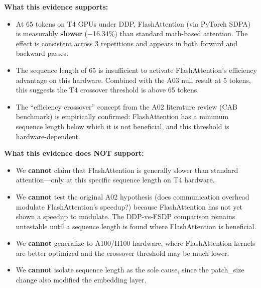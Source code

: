 \documentclass[12pt, a4paper]{article}
\begin{document}
\textbf{What this evidence supports:}
\begin{itemize}
    \item At 65 tokens on T4 GPUs under DDP, FlashAttention (via PyTorch SDPA) is measurably \textbf{slower} ($-$16.34\%) than standard math-based attention. The effect is consistent across 3 repetitions and appears in both forward and backward passes.
    \item The sequence length of 65 is insufficient to activate FlashAttention's efficiency advantage on this hardware. Combined with the A03 null result at 5 tokens, this suggests the T4 crossover threshold is above 65 tokens.
    \item The ``efficiency crossover'' concept from the A02 literature review (CAB benchmark) is empirically confirmed: FlashAttention has a minimum sequence length below which it is not beneficial, and this threshold is hardware-dependent.
\end{itemize}

\textbf{What this evidence does NOT support:}
\begin{itemize}
    \item We \textbf{cannot} claim that FlashAttention is generally slower than standard attention---only at this specific sequence length on T4 hardware.
    \item We \textbf{cannot} test the original A02 hypothesis (does communication overhead modulate FlashAttention's speedup?) because FlashAttention has not yet shown a speedup to modulate. The DDP-vs-FSDP comparison remains untestable until a sequence length is found where FlashAttention is beneficial.
    \item We \textbf{cannot} generalize to A100/H100 hardware, where FlashAttention kernels are better optimized and the crossover threshold may be much lower.
    \item We \textbf{cannot} isolate sequence length as the sole cause, since the patch\_size change also modified the embedding layer.
\end{itemize}
\end{document}
